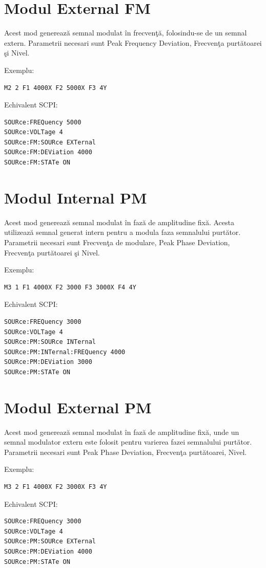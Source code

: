 \section{Modul External FM}
Acest mod genereaz\u{a} semnal modulat \^{i}n frecven\c{t}\u{a}, folosindu-se de un semnal extern. Parametrii necesari sunt Peak Frequency Deviation, Frecven\c{t}a purt\u{a}toarei \c{s}i Nivel.

Exemplu:
\begin{verbatim}
M2 2 F1 4000X F2 5000X F3 4Y
\end{verbatim}

Echivalent SCPI:
\begin{verbatim}
SOURce:FREQuency 5000
SOURce:VOLTage 4
SOURce:FM:SOURce EXTernal
SOURce:FM:DEViation 4000
SOURce:FM:STATe ON
\end{verbatim}

\section{Modul Internal PM}
Acest mod genereaz\u{a} semnal modulat \^{i}n faz\u{a} de amplitudine fix\u{a}. Acesta utilizeaz\u{a} semnal generat intern pentru a modula faza semnalului purt\u{a}tor. Parametrii necesari sunt Frecven\c{t}a de modulare, Peak Phase Deviation, Frecven\c{t}a purt\u{a}toarei \c{s}i Nivel.

Exemplu:
\begin{verbatim}
M3 1 F1 4000X F2 3000 F3 3000X F4 4Y
\end{verbatim}

Echivalent SCPI:
\begin{verbatim}
SOURce:FREQuency 3000
SOURce:VOLTage 4
SOURce:PM:SOURce INTernal
SOURce:PM:INTernal:FREQuency 4000
SOURce:PM:DEViation 3000
SOURce:PM:STATe ON
\end{verbatim}

\section{Modul External PM}
Acest mod genereaz\u{a} semnal modulat \^{i}n faz\u{a} de amplitudine fix\u{a}, unde un semnal modulator extern este folosit pentru varierea fazei semnalului purt\u{a}tor. Parametrii necesari sunt Peak Phase Deviation, Frecven\c{t}a purt\u{a}toarei, Nivel.

Exemplu:
\begin{verbatim}
M3 2 F1 4000X F2 3000X F3 4Y
\end{verbatim}

Echivalent SCPI:
\begin{verbatim}
SOURce:FREQuency 3000
SOURce:VOLTage 4
SOURce:PM:SOURce EXTernal
SOURce:PM:DEViation 4000
SOURce:PM:STATe ON
\end{verbatim}

